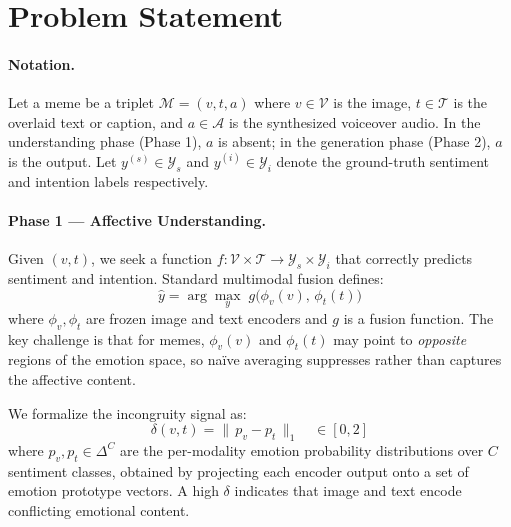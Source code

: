 \section{Problem Statement}

\paragraph{Notation.}
Let a meme be a triplet $\mathcal{M} = (v, t, a)$ where $v \in \mathcal{V}$ is the image,
$t \in \mathcal{T}$ is the overlaid text or caption, and $a \in \mathcal{A}$ is the synthesized
voiceover audio. In the understanding phase (Phase 1), $a$ is absent; in the generation phase (Phase 2),
$a$ is the output. Let $y^{(s)} \in \mathcal{Y}_s$ and $y^{(i)} \in \mathcal{Y}_i$ denote the ground-truth sentiment and intention labels respectively.

\paragraph{Phase 1 — Affective Understanding.}
Given $(v, t)$, we seek a function
$f: \mathcal{V} \times \mathcal{T} \rightarrow \mathcal{Y}_s \times \mathcal{Y}_i$
that correctly predicts sentiment and intention. Standard multimodal fusion defines:
\begin{equation}
  \hat{y} = \arg\max_y\; g\bigl(\phi_v(v),\, \phi_t(t)\bigr)
\end{equation}
where $\phi_v, \phi_t$ are frozen image and text encoders and $g$ is a fusion function. The key
challenge is that for memes, $\phi_v(v)$ and $\phi_t(t)$ may point to \emph{opposite} regions of
the emotion space, so naïve averaging suppresses rather than captures the affective content.

We formalize the incongruity signal as:
\begin{equation}
  \delta(v,t) = \bigl\|\, p_v - p_t \,\bigr\|_1
  \quad \in [0, 2]
\end{equation}
where $p_v, p_t \in \Delta^C$ are the per-modality emotion probability distributions over $C$
sentiment classes, obtained by projecting each encoder output onto a set of emotion prototype vectors.
A high $\delta$ indicates that image and text encode conflicting emotional content.

